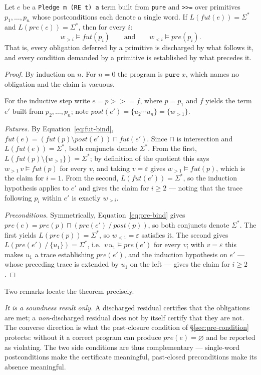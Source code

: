 \documentclass[acmsmall,screen]{acmart}
\newcommand{\RE}{\mathsf{RE}}
\newcommand{\pre}{\mathit{pre}}
\newcommand{\post}{\mathit{post}}
\newcommand{\fut}{\mathit{fut}}
\newcommand{\lquot}{\mathbin{\setminus}}   %
\newcommand{\rquot}{\mathbin{/}}           %
\begin{document}
\begin{theorem}[Soundness of $\RE$-residual checking]
\label{thm:soundness}
Let $e$ be a \lstinline{Pledge m (RE t) a} term built from \lstinline{pure}
and \lstinline{>>=} over primitives $p_1, \dots, p_n$ whose postconditions
each denote a single word.
If $L(\fut(e)) = \Sigma^*$ and $L(\pre(e)) = \Sigma^*$, then for every $i$:
\[
  w_{>i} \models \fut(p_i)
  \qquad\text{and}\qquad
  w_{<i} \models \pre(p_i).
\]
That is, every obligation deferred by a primitive is discharged by what
follows it, and every condition demanded by a primitive is established by
what precedes it.
\end{theorem}
\begin{proof}
By induction on $n$.
For $n = 0$ the program is $\mathtt{pure}\;x$, which names no obligation
and the claim is vacuous.

For the inductive step write $e = p \mathbin{>\!\!>\!\!=} f$, where $p = p_1$
and $f$ yields the term $e'$ built from $p_2, \dots, p_n$; note
$\post(e') = \{u_2 \cdots u_n\} = \{w_{>1}\}$.

\emph{Futures.}
By Equation~\eqref{eq:fut-bind},
$\fut(e) = (\fut(p) \lquot \post(e')) \sqcap \fut(e')$.
Since $\sqcap$ is intersection and $L(\fut(e)) = \Sigma^*$, both conjuncts
denote $\Sigma^*$.
From the first, $L(\fut(p) \lquot \{w_{>1}\}) = \Sigma^*$; by definition of
the quotient this says $w_{>1}\,v \models \fut(p)$ for every $v$, and taking
$v = \varepsilon$ gives $w_{>1} \models \fut(p)$, which is the claim for
$i = 1$.
From the second, $L(\fut(e')) = \Sigma^*$, so the induction hypothesis
applies to $e'$ and gives the claim for $i \geq 2$ --- noting that the
trace following $p_i$ within $e'$ is exactly $w_{>i}$.

\emph{Preconditions.}
Symmetrically, Equation~\eqref{eq:pre-bind} gives
$\pre(e) = \pre(p) \sqcap (\pre(e') \rquot \post(p))$, so both conjuncts
denote $\Sigma^*$.
The first yields $L(\pre(p)) = \Sigma^*$, so $w_{<1} = \varepsilon$
satisfies it.
The second gives $L(\pre(e') \rquot \{u_1\}) = \Sigma^*$, i.e.\
$v\,u_1 \models \pre(e')$ for every $v$; with $v = \varepsilon$ this makes
$u_1$ a trace establishing $\pre(e')$, and the induction hypothesis on $e'$
--- whose preceding trace is extended by $u_1$ on the left --- gives the
claim for $i \geq 2$.
\end{proof}

\noindent
Two remarks locate the theorem precisely.

\emph{It is a soundness result only.}
A discharged residual certifies that the obligations are met; a
\emph{non}-discharged residual does not by itself certify that they are
not.
The converse direction is what the past-closure condition of
\S\ref{sec:pre-condition} protects: without it a correct program can
produce $\pre(e) = \varnothing$ and be reported as violating.
The two side conditions are thus complementary --- single-word
postconditions make the certificate meaningful, past-closed preconditions
make its absence meaningful.
\end{document}
